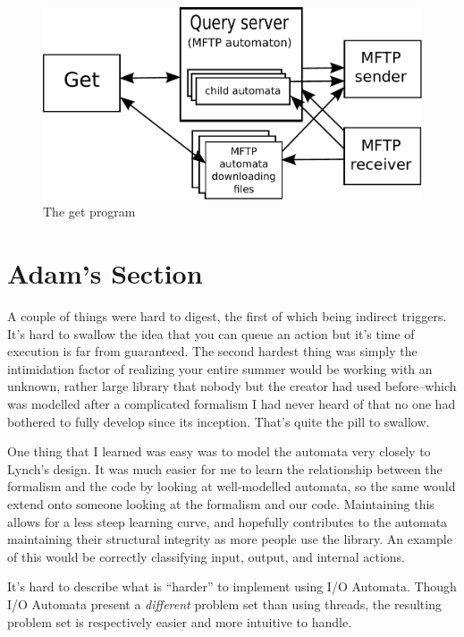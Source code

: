 \documentclass[letterpaper]{article}
\begin{document}
\begin{figure}
  \center
  \includegraphics[scale=0.65]{get_diagram}
  \caption{The get program \label{EvalutationTwo}}
\end{figure}

\section{Adam's Section}
A couple of things were hard to digest, the first of which being indirect triggers.  
It's hard to swallow the idea that you can queue an action but it's time of execution is far from guaranteed.  
The second hardest thing was simply the intimidation factor of realizing your entire summer would be working with an unknown, rather large library that nobody but the creator had used before--which was modelled after a complicated formalism I had never heard of that no one had bothered to fully develop since its inception.  
That's quite the pill to swallow.

One thing that I learned was easy was to model the automata very closely to Lynch's design.  
It was much easier for me to learn the relationship between the formalism and the code by looking at well-modelled automata, so the same would extend onto someone looking at the formalism and our code. 
Maintaining this allows for a less steep learning curve, and hopefully contributes to the automata maintaining their structural integrity as more people use the library.
An example of this would be correctly classifying input, output, and internal actions.

It's hard to describe what is ``harder'' to implement using I/O Automata.  
Though I/O Automata present a \emph{different} problem set than using threads, the resulting problem set is respectively easier and more intuitive to handle.  
\end{document}
